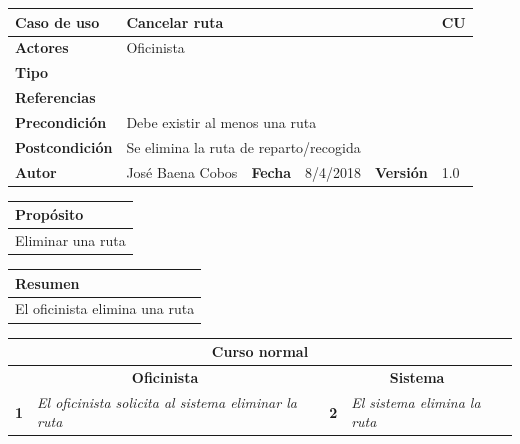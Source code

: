 \documentclass[12pt,spanish]{article}
\begin{document}
\begin{table}[H]
	\centering
	\begin{tabular}{|m{3cm}|m{4cm}|m{2cm}|m{2cm}|m{2cm}|m{1cm}|}
		\hline
		\textbf{Caso de uso} &  \multicolumn{4}{m{11cm}|}{Cancelar ruta} \vline &  \cellcolor{gray!40}CU\arabic{contadorCU}  \stepcounter{contadorCU} \\
		\hline
		\textbf{Actores} & \multicolumn{5}{m{11cm}|}{Oficinista} \\
		\hline
		\textbf{Tipo} & \multicolumn{5}{m{11cm}|}{} \\
		\hline
		\textbf{Referencias} &\multicolumn{5}{m{11cm}|}{} \\
		\hline
		\textbf{Precondición} & \multicolumn{5}{m{11cm}|}{Debe existir al menos una ruta} \\
		\hline
		\textbf{Postcondición} & \multicolumn{5}{m{11cm}|}{Se elimina la ruta de reparto/recogida} \\
		\hline
		\textbf{Autor} & José Baena Cobos & \textbf{Fecha} & 8/4/2018 & \textbf{Versión} & 1.0 \\
		\hline
	\end{tabular}
	
	\vspace{1cm}
	
	\begin{tabular}{|m{16.2cm}|}
		\hline
		\textbf{Propósito} \\
		\hline
		Eliminar una ruta\\
		\hline
	\end{tabular}
	
	\vspace{1cm}
	
	\begin{tabular}{|m{16.2cm}|}
		\hline
		\textbf{Resumen} \\
		\hline
		El oficinista elimina una ruta\\
		\hline
	\end{tabular}
	
	\vspace{1cm}
	
	\begin{tabular}{|m{5pt}|m{7.33cm}|m{5pt}|m{7.33cm}|}
		\hline
		\multicolumn{4}{|c|}{\textbf{Curso normal}} \\
		\hline
		\multicolumn{2}{|c}{\textbf{Oficinista}} & \multicolumn{2}{|c|}{\textbf{Sistema}} \\
		\hline
		\textbf{1} & \textit{El oficinista solicita al sistema eliminar la ruta} & \textbf{2} & \textit{El sistema elimina la ruta} \\
		\hline
	

\end{tabular}
\end{table}
\end{document}
